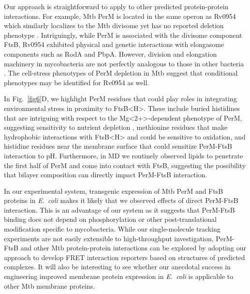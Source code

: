 \documentclass[pdflatex,sn-nature]{sn-jnl}%
\def\textsuperscript#1{<#1>}%
\newcommand\ec{\textit{E.~coli}}
\newcommand\mtb{Mtb}
\newcommand\ftsbH{FtsB\textsuperscript{H}}
\begin{document}
Our approach is straightforward to apply to other predicted protein-protein interactions.
For example, \mtb{} PerM is located in the same operon as Rv0954 which similarly localizes to the \mtb{} divisome yet has no reported deletion phenotype \citep{wangRv0954MemberMycobacterial2021a}.
Intriguingly, while PerM is associated with the divisome component FtsB, Rv0954 exhibited physical and genetic interactions with elongasome components such as RodA and PbpA.
However, division and elongation machinery in mycobacteria are not perfectly analogous to those in other bacteria \cite{baranowskiDreamMycobacterium2019}.
The cell-stress phenotypes of PerM depletion in \mtb{} suggest that conditional phenotypes may be identified for Rv0954 as well.

In Fig.~\ref{fig6}D, we highlight PerM residues that could play roles in integrating environmental stress in proximity to \ftsbH{}.
These include buried histidines that are intriguing with respect to the Mg\textsuperscript{2+}-dependent phenotype of PerM, suggesting sensitivity to nutrient depletion \citep{goodsmithDisruptionTuberculosisMembrane2015}, methionine residues that make hydrophobic interactions with \ftsbH{} and could be sensitive to oxidation, and histidine residues near the membrane surface that could sensitize PerM-FtsB interaction to pH.
Furthermore, in MD we routinely observed lipids to penetrate the first half of PerM and come into contact with FtsB, suggesting the possibility that bilayer composition can directly impact PerM-FtsB interaction.

In our experimental system, transgenic expression of \mtb{} PerM and FtsB proteins in \ec{} makes it likely that we observed effects of direct PerM-FtsB interaction.
This is an advantage of our system as it suggests that PerM-FtsB binding does not depend on phosphorylation or other post-translational modification specific to mycobacteria.
While our single-molecule tracking experiments are not easily extensible to high-throughput investigation, PerM-FtsB and other \mtb{} protein-protein interactions can be explored by adopting our approach to develop FRET interaction reporters based on structures of predicted complexes.
It will also be interesting to see whether our anecdotal success in engineering improved membrane protein expression in \ec{} is applicable to other \mtb{} membrane proteins.
\end{document}
